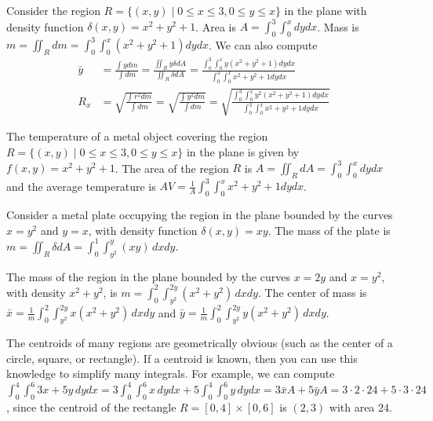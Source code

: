 \begin{example}
Consider the region {$R = \{(x,y)\mid 0\leq x\leq 3, 0\leq y\leq x\} $} in the plane
with density function {$\delta(x,y) = x^2+y^2+1$}.  
Area is $A=\int_{0}^{3} \int_{0}^{x} dy dx$. Mass is $m=\iint_R dm=\int_{0}^{3}
\int_{0}^{x} (x^2+y^2+1)dy dx$. We can also compute
\begin{align*}
\bar y &= \frac{\int y dm}{\int dm}= \frac{\iint_R y \delta dA}{\iint_R \delta dA} =
\frac{\int_{0}^{3} \int_{0}^{x} y(x^2+y^2+1)dy dx}{\int_{0}^{3} \int_{0}^{x}
x^2+y^2+1dy dx}\\
R_x &= \sqrt{\frac{\int r^2 dm}{\int dm}} =\sqrt{\frac{\int y^2 dm}{\int dm}} =
\sqrt{\frac{\int_{0}^{3} \int_{0}^{x} y^2(x^2+y^2+1)dy dx}{\int_{0}^{3}
\int_{0}^{x} x^2+y^2+1dy dx}}
\end{align*}
\end{example}

\begin{example}
The temperature of a metal object covering the region {$R = \{(x,y)\mid 0\leq
x\leq 3, 0\leq y\leq x\} $} in the plane is given by {$f(x,y) = x^2+y^2+1$}. 
The area of the region $R$ is $A=\iint_R dA = \int_{0}^{3} \int_{0}^{x} dy
dx$ and the average temperature is $AV=\frac{1}{A}
\displaystyle\int_{0}^{3} \int_{0}^{x} x^2+y^2+1 dy dx$. 
\end{example}

\begin{example}
Consider a metal plate occupying the region in the plane bounded by
the curves {$x=y^2$} and {$y=x$}, with density function {$\delta(x,y) =
xy$}.  The mass of the plate is $m=\iint_R \delta dA = \int_0^1\int_{y^2}^{y}
(xy)\,dxdy$.
\end{example}
\begin{example}
The mass of the region in the plane bounded by the curves {$ x=2y $}
and {$ x=y^2 $}, with density {$ x^2+y^2 $}, is
$m=\int_0^2\int_{y^2}^{2y}(x^2+y^2) \,dxdy$. The center of mass is $\bar x =
\frac{1}{m}\int_0^2\int_{y^2}^{2y} x (x^2+y^2) \,dxdy$ and $\bar y =
\frac{1}{m}\int_0^2\int_{y^2}^{2y} y (x^2+y^2) \,dxdy$.
\end{example}

The centroids of many regions are geometrically obvious (such as the
center of a circle, square, or rectangle).   If a centroid is known,
then you can use this knowledge to simplify many integrals.  For
example, we can compute $\displaystyle \int_0^4\int_0^6 3x+5y \,dydx =
3\int_0^4\int_0^6 x \,dydx + 5\int_0^4\int_0^6 y \,dydx= 3\bar x A +5\bar y A = 3\cdot 2\cdot
24 + 5\cdot 3\cdot 24$, since the centroid of the rectangle $R=[0,4]\times[0,6]$ is
$(2,3)$ with area $24$.   





